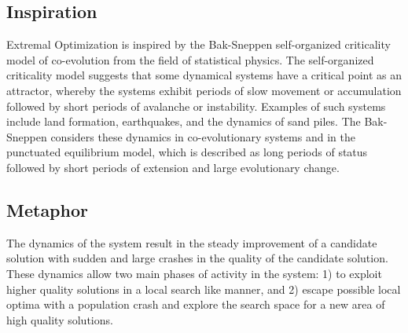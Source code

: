 \subsection{Inspiration}
Extremal Optimization is inspired by the Bak-Sneppen self-organized criticality model of co-evolution from the field of statistical physics. 
The self-organized criticality model suggests that some dynamical systems have a critical point as an attractor, whereby the systems exhibit periods of slow movement or accumulation followed by short periods of avalanche or instability. Examples of such systems include land formation, earthquakes, and the dynamics of sand piles. The Bak-Sneppen considers these dynamics in co-evolutionary systems and in the punctuated equilibrium model, which is described as long periods of status followed by short periods of extension and large evolutionary change.

\subsection{Metaphor}
The dynamics of the system result in the steady improvement of a candidate solution with sudden and large crashes in the quality of the candidate solution. These dynamics allow two main phases of activity in the system: 1) to exploit higher quality solutions in a local search like manner, and 2) escape possible local optima with a population crash and explore the search space for a new area of high quality solutions.

